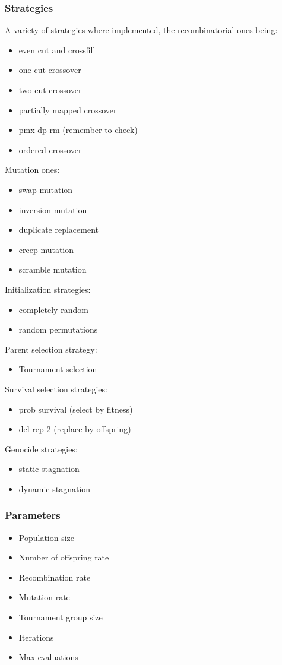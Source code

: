 \subsubsection{Strategies}
A variety of strategies where implemented, the recombinatorial ones being:
\begin{itemize}
    \item even cut and crossfill
    \item one cut crossover
    \item two cut crossover
    \item partially mapped crossover
    \item pmx dp rm (remember to check)
    \item ordered crossover
\end{itemize}
Mutation ones:
\begin{itemize}
    \item swap mutation
    \item inversion mutation
    \item duplicate replacement
    \item creep mutation
    \item scramble mutation
\end{itemize}
Initialization strategies:
\begin{itemize}
    \item completely random
    \item random permutations
\end{itemize}
Parent selection strategy:
\begin{itemize}
    \item Tournament selection
\end{itemize}
Survival selection strategies:
\begin{itemize}
    \item prob survival (select by fitness)
    \item del rep 2 (replace by offspring)
\end{itemize}
Genocide strategies:
\begin{itemize}
    \item static stagnation
    \item dynamic stagnation
\end{itemize}
\subsubsection{Parameters}
\begin{itemize}
    \item Population size
    \item Number of offspring rate
    \item Recombination rate
    \item Mutation rate
    \item Tournament group size
    \item Iterations
    \item Max evaluations
\end{itemize}
